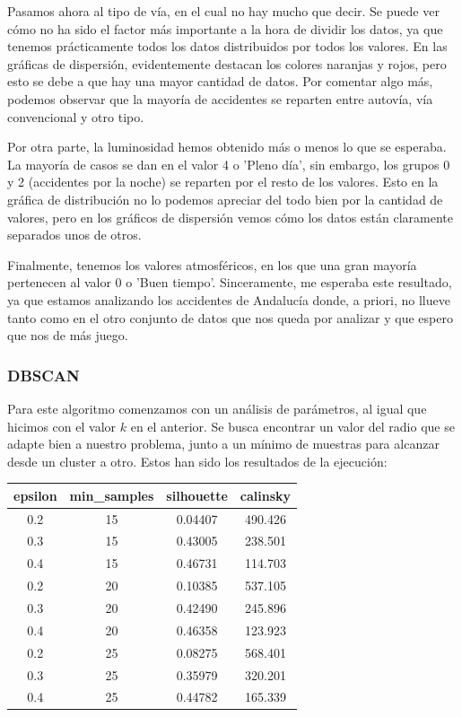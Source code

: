 \documentclass[11pt,a4paper]{article}
\begin{document}
Pasamos ahora al tipo de vía, en el cual no hay mucho que decir. Se puede ver cómo no ha sido el factor más importante a la hora
de dividir los datos, ya que tenemos prácticamente todos los datos distribuidos por todos los valores. En las gráficas de dispersión,
evidentemente destacan los colores naranjas y rojos, pero esto se debe a que hay una mayor cantidad de datos. Por comentar algo más,
podemos observar que la mayoría de accidentes se reparten entre autovía, vía convencional y otro tipo.

Por otra parte, la luminosidad hemos obtenido más o menos lo que se esperaba. La mayoría de casos se dan en el valor 4 o 'Pleno
día', sin embargo, los grupos 0 y 2 (accidentes por la noche) se reparten por el resto de los valores. Esto en la gráfica de
distribución no lo podemos apreciar del todo bien por la cantidad de valores, pero en los gráficos de dispersión vemos cómo los
datos están claramente separados unos de otros.

Finalmente, tenemos los valores atmosféricos, en los que una gran mayoría pertenecen al valor 0 o 'Buen tiempo'. Sinceramente, me
esperaba este resultado, ya que estamos analizando los accidentes de Andalucía donde, a priori, no llueve tanto como en el otro
conjunto de datos que nos queda por analizar y que espero que nos de más juego.


\subsubsection*{DBSCAN}

Para este algoritmo comenzamos con un análisis de parámetros, al igual que hicimos con el valor $k$ en el anterior. Se busca
encontrar un valor del radio que se adapte bien a nuestro problema, junto a un mínimo de muestras para alcanzar desde un cluster
a otro. Estos han sido los resultados de la ejecución:

\begin{table}[H]
    \centering
    \begin{tabular}{|c|c|c|c|}
    \hline
    \textbf{epsilon} & \textbf{min\_samples} & \textbf{silhouette} & \textbf{calinsky} \\ \hline
    0.2 & 15 & 0.04407 & 490.426 \\ \hline
    0.3 & 15 & 0.43005 & 238.501 \\ \hline
    0.4 & 15 & 0.46731 & 114.703 \\ \hline
    0.2 & 20 & 0.10385 & 537.105 \\ \hline
    0.3 & 20 & 0.42490 & 245.896 \\ \hline
    0.4 & 20 & 0.46358 & 123.923 \\ \hline
    0.2 & 25 & 0.08275 & 568.401 \\ \hline
    0.3 & 25 & 0.35979 & 320.201 \\ \hline
    0.4 & 25 & 0.44782 & 165.339 \\ \hline
    \end{tabular}
\end{table}
\end{document}
